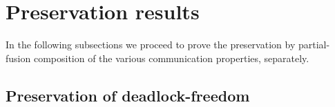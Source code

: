 
\section{Preservation results}
\label{sect:presres}
In the following subsections we proceed to prove the preservation by partial-fusion composition of the
various communication properties, separately.


\subsection{Preservation of  deadlock-freedom}


